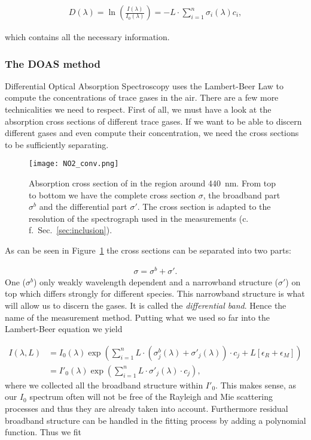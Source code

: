 \begin{align*}
  D(\lambda) = \ln \left(\frac{I(\lambda)}{I_0(\lambda)}\right) = - L
  \cdot \sum_{i=1}^n \sigma_i(\lambda) c_i,
\end{align*}

which contains all the necessary information.

\subsubsection{The DOAS method}
\label{sec:doas}

Differential Optical Absorption Spectroscopy uses the Lambert-Beer Law
to compute the concentrations of trace gases in the air. There are a
few more technicalities we need to respect. First of all, we must have
a look at the absorption cross sections of different trace gases. If we
want to be able to discern different gases and even compute their
concentration, we need the cross sections to be sufficiently
separating.

\begin{figure}[htbp]
  \centering
  \texttt{[image: NO2\_conv.png]}
  \caption{Absorption cross section of  in the region around
    \SI{440}{\nano\meter}. From top to bottom we have the complete
    cross section $\sigma$, the broadband part $\sigma^b$ and the
    differential part $\sigma'$. The cross section is adapted to the
    resolution of the spectrograph used in the measurements
    (c.\,f.\ Sec.~\ref{sec:inclusion}).}
  \label{fig:no2-cross}
\end{figure}

As can be seen in Figure~\ref{fig:no2-cross} the
cross sections can be separated into two parts: 

\begin{align*}
  \sigma = \sigma^b + \sigma'.
\end{align*}
One ($\sigma^b$) only weakly
wavelength dependent and a narrowband
structure ($\sigma'$) on top which differs strongly for different species. This
narrowband structure is what will allow us to discern the gases. It is
called the \emph{differential band}. Hence the name of the measurement
method. Putting what we used so far into the Lambert-Beer equation we
yield

\begin{align*}
  I(\lambda, L) & = I_0(\lambda) \exp \left ( \sum_{i=1}^n L \cdot
                  (\sigma^b_j(\lambda) + \sigma'_j(\lambda))\cdot c_j + L[\epsilon_R +
                  \epsilon_M]\right) \\
                & = I'_0(\lambda) \exp \left( \sum_{i=1}^n L \cdot
                  \sigma'_j(\lambda) \cdot c_j \right),
\end{align*}
where we collected all the broadband structure within $I'_0$. This
makes sense, as our $I_0$ spectrum often will not be free of the Rayleigh
and Mie scattering processes and thus they are already taken into
account. Furthermore residual broadband structure can be handled in
the fitting process by adding a polynomial function. Thus we fit

